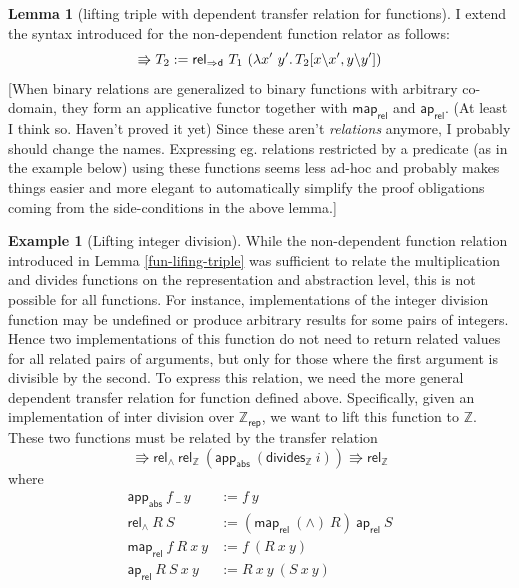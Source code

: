 \documentclass[]{article}
\theoremstyle{definition}
\newtheorem{lemma}[theorem]{Lemma}
\newtheorem{example}{Example}[section]
\newcommand{\relfund}{\mathsf{rel_{\Rightarrow d}}}
\newcommand{\inte}{\mathbb{Z}}
\newcommand{\rep}{\mathsf{rep}}
\newcommand{\relint}{\mathsf{rel_\inte}}
\newcommand{\appabs}{\mathsf{app_{abs}}}
\newcommand{\reland}{\mathsf{rel_\land}}
\newcommand{\maprel}{\mathsf{map_{rel}}}
\newcommand{\aprel}{\mathsf{ap_{rel}}}
\begin{document}
\begin{lemma}[lifting triple with dependent transfer relation for functions]
	I extend the syntax introduced for the non-dependent function relator as follows:
	\begin{equation*}
		[x\ y :: T_1] \Rrightarrow T_2 := \relfund\ T_1\ (\lambda x'\ y'\ldotp T_2[x \backslash x', y \backslash y'])
	\end{equation*}
	[When binary relations are generalized to binary functions with arbitrary co-domain, they form an applicative functor together with \(\maprel\) and \(\aprel\). (At least I think so. Haven't proved it yet) Since these aren't \textit{relations} anymore, I probably should change the names. Expressing eg. relations restricted by a predicate (as in the example below) using these functions seems less ad-hoc and probably makes things easier and more elegant to automatically simplify the proof obligations coming from the side-conditions in the above lemma.]
\end{lemma}

\begin{example}[Lifting integer division]
	While the non-dependent function relation introduced in Lemma \ref{fun-lifing-triple} was sufficient to relate the multiplication and divides functions on the representation and abstraction level, this is not possible for all functions. For instance, implementations of the integer division function may be undefined or produce arbitrary results for some pairs of integers. Hence two implementations of this function do not need to return related values for all related pairs of arguments, but only for those where the first argument is divisible by the second. To express this relation, we need the more general dependent transfer relation for function defined above. Specifically, given an implementation of inter division over \(\inte_{\rep}\), we want to lift this function to \(\inte\). These two functions must be related by the transfer relation
	\begin{equation*}
		[\_\ i :: \relint] \Rrightarrow \reland\ \relint\ (\appabs\ (\mathsf{divides_\inte}\ i)) \Rrightarrow \relint
	\end{equation*}
	where
	\begin{align*}
		\appabs\ f\ \_\ y &:= f\ y \\
		\reland\ R\ S &:= (\maprel\ (\land)\ R)\ \aprel\ S \\
		\maprel\ f\ R\ x\ y &:= f\ (R\ x\ y) \\
		\aprel\ R\ S\ x\ y &:= R\ x\ y\ (S\ x\ y)
	\end{align*}
\end{example}
\end{document}
